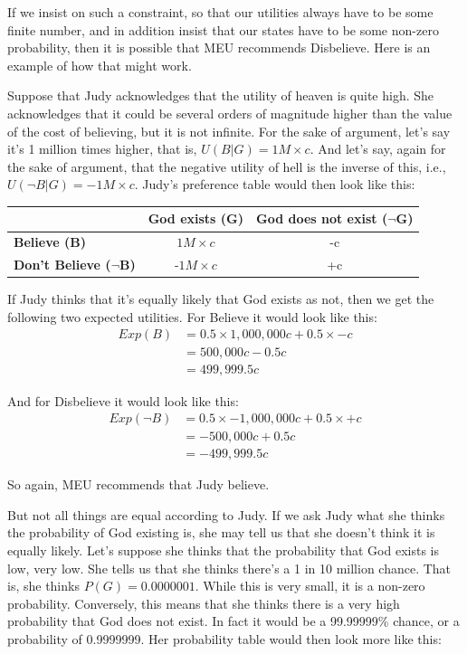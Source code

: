 \documentclass[]{tufte-book}
\begin{document}
If we insist on such a constraint, so that our utilities always have to be some finite number, and in addition insist that our states have to be some non-zero probability, then it is possible that MEU recommends Disbelieve. Here is an example of how that might work.

Suppose that Judy acknowledges that the utility of heaven is quite high. She acknowledges that it could be several orders of magnitude higher than the value of the cost of believing, but it is not infinite. For the sake of argument, let's say it's 1 million times higher, that is, \(U(B|G)=1M\times c\). And let's say, again for the sake of argument, that the negative utility of hell is the inverse of this, i.e., \(U(\neg B|G)= - 1M\times c\). Judy's preference table would then look like this:

\begin{longtable}[]{@{}lcc@{}}
\toprule
& God exists (G) & God does not exist (\(\neg\)G)\tabularnewline
\midrule
\endhead
\textbf{Believe (B)} & \(1M\times c\) & -c\tabularnewline
\textbf{Don't Believe (\(\neg\)B)} & -\(1M\times c\) & +c\tabularnewline
\bottomrule
\end{longtable}

If Judy thinks that it's equally likely that God exists as not, then we get the following two expected utilities.
For Believe it would look like this:
\[
\begin{split}
Exp(B)&= 0.5 \times 1,000,000c + 0.5 \times -c \\
&= 500,000c - 0.5c \\
&= 499,999.5c
\end{split}
\]

And for Disbelieve it would look like this:
\[
\begin{split}
Exp(\neg B)&= 0.5 \times -1,000,000c + 0.5 \times +c \\
&= -500,000c + 0.5c \\
&= -499,999.5c
\end{split}
\]

So again, MEU recommends that Judy believe.

But not all things are equal according to Judy. If we ask Judy what she thinks the probability of God existing is, she may tell us that she doesn't think it is equally likely. Let's suppose she thinks that the probability that God exists is low, very low. She tells us that she thinks there's a 1 in 10 million chance. That is, she thinks \(P(G)=0.0000001\). While this is very small, it is a non-zero probability. Conversely, this means that she thinks there is a very high probability that God does not exist. In fact it would be a 99.99999\% chance, or a probability of 0.9999999. Her probability table would then look more like this:
\end{document}
